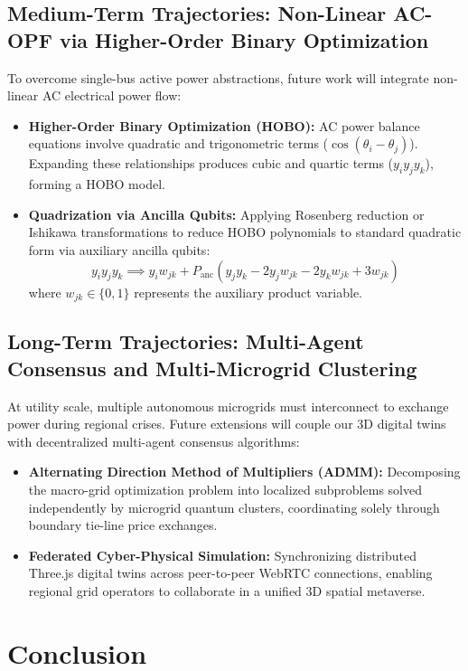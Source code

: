 \documentclass[11pt,a4paper]{article}
\theoremstyle{definition}
\theoremstyle{remark}
\begin{document}
\subsection{Medium-Term Trajectories: Non-Linear AC-OPF via Higher-Order Binary Optimization}
To overcome single-bus active power abstractions, future work will integrate non-linear AC electrical power flow:
\begin{itemize}
    \item \textbf{Higher-Order Binary Optimization (HOBO):} AC power balance equations involve quadratic and trigonometric terms ($\cos(\theta_i - \theta_j)$). Expanding these relationships produces cubic and quartic terms ($y_i y_j y_k$), forming a HOBO model.
    \item \textbf{Quadrization via Ancilla Qubits:} Applying Rosenberg reduction or Ishikawa transformations to reduce HOBO polynomials to standard quadratic form via auxiliary ancilla qubits:
    \begin{equation}
    y_i y_j y_k \implies y_i w_{jk} + P_{\text{anc}} (y_j y_k - 2 y_j w_{jk} - 2 y_k w_{jk} + 3 w_{jk})
    \end{equation}
    where $w_{jk} \in \{0, 1\}$ represents the auxiliary product variable.
\end{itemize}

\subsection{Long-Term Trajectories: Multi-Agent Consensus and Multi-Microgrid Clustering}
At utility scale, multiple autonomous microgrids must interconnect to exchange power during regional crises. Future extensions will couple our 3D digital twins with decentralized multi-agent consensus algorithms:
\begin{itemize}
    \item \textbf{Alternating Direction Method of Multipliers (ADMM):} Decomposing the macro-grid optimization problem into localized subproblems solved independently by microgrid quantum clusters, coordinating solely through boundary tie-line price exchanges.
    \item \textbf{Federated Cyber-Physical Simulation:} Synchronizing distributed Three.js digital twins across peer-to-peer WebRTC connections, enabling regional grid operators to collaborate in a unified 3D spatial metaverse.
\end{itemize}

\section{Conclusion}
\label{sec:conclusion}
\end{document}
